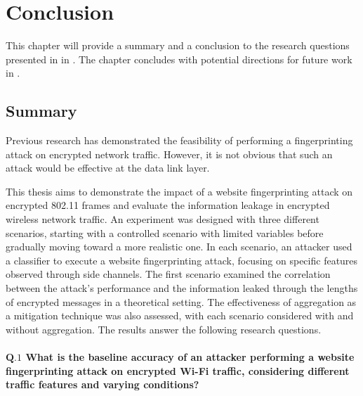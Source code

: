 \chapter{Conclusion\label{ch:conclusion}}

This chapter will provide a summary and a conclusion to the research questions presented in   in . The chapter concludes with potential directions for future work in .

\clearpage

\section{Summary\label{sec:summary-conclusion}}

Previous research \cite{DBLP:conf/sp/DyerCRS12, DBLP:conf/ctrsa/GellertJLN22, DBLP:conf/pet/GongBKS12, DBLP:conf/pet/Hintz02, DBLP:conf/pet/MillerHJT14, DBLP:conf/ccnc/MuehlsteinZBKDD17, DBLP:journals/popets/WangG16} has demonstrated the feasibility of performing a fingerprinting attack on encrypted network traffic. However, it is not obvious that such an attack would be effective at the data link layer.

This thesis aims to demonstrate the impact of a website fingerprinting attack on encrypted 802.11 frames and evaluate the information leakage in encrypted wireless network traffic. An experiment was designed with three different scenarios, starting with a controlled scenario with limited variables before gradually moving toward a more realistic one. In each scenario, an attacker used a classifier to execute a website fingerprinting attack, focusing on specific features observed through side channels. The first scenario examined the correlation between the attack's performance and the information leaked through the lengths of encrypted messages in a theoretical setting. The effectiveness of aggregation as a mitigation technique was also assessed, with each scenario considered with and without aggregation. The results answer the following research questions.
\\
\\
\textbf{$\mathbf{Q.1}$ What is the baseline accuracy of an attacker performing a website fingerprinting attack on encrypted Wi-Fi traffic, considering different traffic features and varying conditions?}

